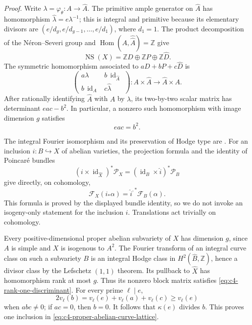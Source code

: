 \emph{Proof.}
Write $\lambda=\varphi_\theta:A\to\widehat A$. The primitive
ample generator on $\widehat A$ has homomorphism
$\widehat\lambda=e\lambda^{-1}$; this is integral and primitive
because its elementary divisors are
$(e/d_g,e/d_{g-1},\ldots,e/d_1)$, where $d_1=1$.
The product decomposition of the N\'eron--Severi group and
$\operatorname{Hom}(A,\widehat{\widehat A})=\mathbb Z$
give
\[
 \operatorname{NS}(X)=\mathbb ZD\oplus\mathbb ZP
                         \oplus\mathbb Z\widehat D.
\]
The symmetric homomorphism associated to $aD+bP+c\widehat D$
is
\begin{equation}\label{eq:c4-polarization-block}
 \begin{pmatrix}
  a\lambda&b\,\operatorname{id}_{\widehat A}\\
  b\,\operatorname{id}_A&c\widehat\lambda
 \end{pmatrix}:A\times\widehat A\longrightarrow\widehat A\times A.
\end{equation}
After rationally identifying $\widehat A$ with $A$ by $\lambda$,
its two-by-two scalar matrix has determinant $eac-b^2$.
In particular, a nonzero such homomorphism with image dimension
$g$ satisfies
\begin{equation}\label{eq:c4-rank-one-discriminant}
                             eac=b^2.
\end{equation}

The integral Fourier isomorphism and its preservation of Hodge
type are \citet[Proposition 1, p.~241]{frC4Beauville1983}.
For an inclusion $i:B\hookrightarrow X$ of abelian varieties,
the projection formula and the identity of Poincar\'e bundles
\[
 (i\times\operatorname{id}_{\widehat X})^*\mathcal P_X
   =(\operatorname{id}_B\times\widehat i)^*\mathcal P_B
\]
give directly, on cohomology,
\[
               \mathcal F_X(i_*\alpha)
                   =\widehat i^{,*}\mathcal F_B(\alpha).
\]
This formula is proved by the displayed bundle identity, so we
do not invoke an isogeny-only statement for the inclusion $i$.
Translations act trivially on cohomology.

Every positive-dimensional proper abelian subvariety of $X$
has dimension $g$, since $A$ is simple and $X$ is isogenous to
$A^2$. The Fourier transform of an integral curve class on such
a subvariety $B$ is an integral Hodge class in
$H^2(\widehat B,\mathbb Z)$, hence a divisor class by the
Lefschetz $(1,1)$ theorem. Its pullback to $\widehat X$ has
homomorphism rank at most $g$.
Thus its nonzero block matrix satisfies
\eqref{eq:c4-rank-one-discriminant}. For every prime $\ell\mid e$,
\[
 2v_\ell(b)=v_\ell(e)+v_\ell(a)+v_\ell(c)
                  \ge v_\ell(e)
\]
when $abc\ne0$; if $ac=0$, then $b=0$.
It follows that $\kappa(e)$ divides $b$. This proves one inclusion
in \eqref{eq:c4-proper-abelian-curve-lattice}.

